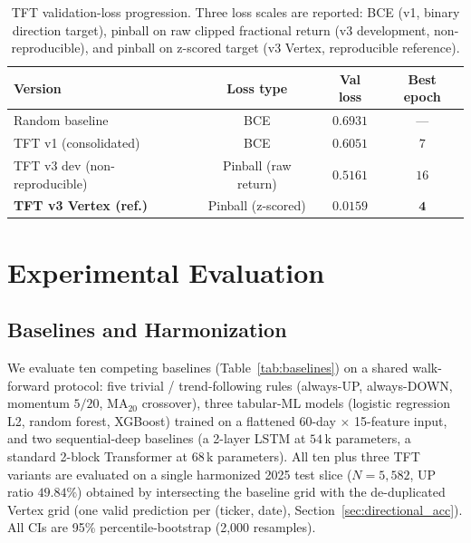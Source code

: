 \documentclass[conference]{IEEEtran}
\begin{document}
\begin{table}[htbp]
\centering
\caption{TFT validation-loss progression. Three loss scales are reported: BCE (v1, binary direction target), pinball on raw clipped fractional return (v3 development, non-reproducible), and pinball on z-scored target (v3 Vertex, reproducible reference).}
\label{tab:tft_progression}
\scriptsize
\setlength{\tabcolsep}{4pt}
\begin{tabular}{lccc}
\toprule
\textbf{Version} & \textbf{Loss type} & \textbf{Val loss} & \textbf{Best epoch} \\
\midrule
Random baseline               & BCE                   & $0.6931$ & ---        \\
TFT v1 (consolidated)         & BCE                   & $0.6051$ & $7$        \\
TFT v3 dev (non-reproducible) & Pinball (raw return)  & $0.5161$ & $16$       \\
\textbf{TFT v3 Vertex (ref.)} & Pinball (z-scored)    & $\mathbf{0.0159}$ & $\mathbf{4}$ \\
\bottomrule
\end{tabular}
\end{table}

\section{Experimental Evaluation}\label{sec:experiments}

\subsection{Baselines and Harmonization}

We evaluate ten competing baselines (Table~\ref{tab:baselines}) on a shared walk-forward protocol: five trivial / trend-following rules (always-UP, always-DOWN, momentum $5/20$, MA$_{20}$ crossover), three tabular-ML models (logistic regression L2, random forest, XGBoost) trained on a flattened 60-day $\times$ 15-feature input, and two sequential-deep baselines (a 2-layer LSTM at $54$\,k parameters, a standard 2-block Transformer at $68$\,k parameters). All ten plus three TFT variants are evaluated on a single harmonized 2025 test slice ($N=5{,}582$, UP ratio $49.84\%$) obtained by intersecting the baseline grid with the de-duplicated Vertex grid (one valid prediction per (ticker, date), Section~\ref{sec:directional_acc}). All CIs are 95\% percentile-bootstrap (2{,}000 resamples).
\end{document}
